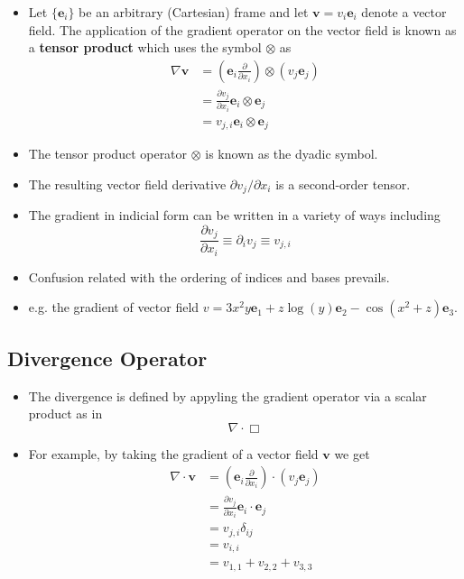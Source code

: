 \documentclass[11pt]{article}
\begin{document}
\begin{itemize}
\item Let \(\{\boldsymbol{e}_i\}\) be an arbitrary (Cartesian) frame and let \(\boldsymbol{v} = v_i \boldsymbol{e}_i\) denote a vector field. The application of the gradient operator on the vector field is known as a \textbf{tensor product} which uses the symbol \(\otimes\) as
\begin{align}
 \nabla \boldsymbol{v} & = \left(\boldsymbol{e}_i \frac{\partial}{\partial x_i}\right) \otimes (v_j \boldsymbol{e}_j) \\
                      & = \frac{\partial v_j}{\partial x_i} \boldsymbol{e}_i \otimes  \boldsymbol{e}_j \\
                      & = v_{j,i} \boldsymbol{e}_i \otimes  \boldsymbol{e}_j 
\end{align}
\end{itemize}
\begin{itemize}
\item The tensor product operator \(\otimes\) is known as the dyadic symbol.
\item The resulting vector field derivative \(\partial v_j/\partial x_i\) is a second-order tensor.
\item The gradient in indicial form can be written in a variety of ways including $$\frac{\partial v_j}{\partial x_i} \equiv \partial_i v_j \equiv v_{j,i}$$
\item Confusion related with the ordering of indices and bases prevails.
\item e.g. the gradient of vector field \(v = 3x^2y \boldsymbol{e}_1 + z\log(y) \boldsymbol{e}_2 - \cos(x^2+z) \boldsymbol{e}_3\).
\end{itemize}
\subsection*{Divergence Operator}
\label{sec:org91c33a8}
\begin{itemize}
\item The divergence is defined by appyling the gradient operator via a scalar product as in
$$ \nabla \cdot \Box $$
\end{itemize}
\begin{itemize}
\item For example, by taking the gradient of a vector field \(\boldsymbol{v}\) we get
\begin{align}
\nabla \cdot \boldsymbol{v} & = \left(\boldsymbol{e}_i \frac{\partial}{\partial x_i}\right) \cdot (v_j \boldsymbol{e}_j) \\
                      & = \frac{\partial v_j}{\partial x_i} \boldsymbol{e}_i \cdot  \boldsymbol{e}_j \\
                      & = v_{j,i} \delta_{ij} \\
                      & = v_{i,i} \\
                      & = v_{1,1} + v_{2,2} + v_{3,3}
\end{align}
\end{itemize}
\end{document}
